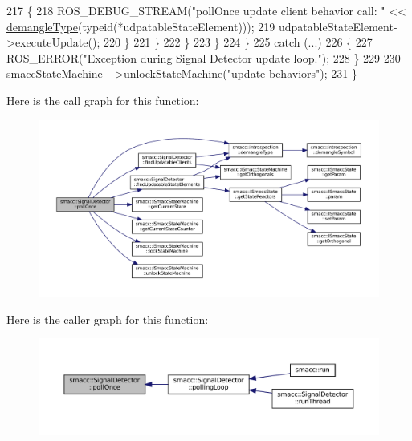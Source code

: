 \begin{DoxyCode}
217                         \{
218                             ROS\_DEBUG\_STREAM(\textcolor{stringliteral}{"pollOnce update client behavior call: "} << 
      \hyperlink{namespacesmacc_1_1introspection_a670e39ccea29952859df4e2d0e45077b}{demangleType}(\textcolor{keyword}{typeid}(*udpatableStateElement)));
219                             udpatableStateElement->executeUpdate();
220                         \}
221                     \}
222                 \}
223             \}
224         \}
225         \textcolor{keywordflow}{catch} (...)
226         \{
227             ROS\_ERROR(\textcolor{stringliteral}{"Exception during Signal Detector update loop."});
228         \}
229 
230         \hyperlink{classsmacc_1_1SignalDetector_a46025de6ac7b5980e22144f9703236a4}{smaccStateMachine\_}->\hyperlink{classsmacc_1_1ISmaccStateMachine_ae2e3ceb87bfe3f9d8bf320e36071fdc7}{unlockStateMachine}(\textcolor{stringliteral}{"update behaviors"});
231     \}
\end{DoxyCode}
Here is the call graph for this function\+:
\nopagebreak
\begin{figure}[H]
\begin{center}
\leavevmode
\includegraphics[width=350pt]{classsmacc_1_1SignalDetector_a9a116479e23259f3a5d5d4a47278afd5_cgraph}
\end{center}
\end{figure}
Here is the caller graph for this function\+:
\nopagebreak
\begin{figure}[H]
\begin{center}
\leavevmode
\includegraphics[width=350pt]{classsmacc_1_1SignalDetector_a9a116479e23259f3a5d5d4a47278afd5_icgraph}
\end{center}
\end{figure}
\mbox{\label{classsmacc_1_1SignalDetector_a6ab99d99cef8d101e39797a72daeb2b7}} 
